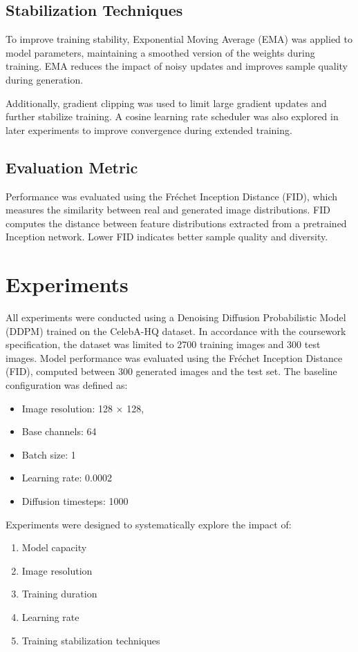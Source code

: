\documentclass[conference]{IEEEtran}
\begin{document}
\subsection{Stabilization Techniques}

To improve training stability, Exponential Moving Average (EMA) was applied to model parameters, maintaining a smoothed version of the weights during training. EMA reduces the impact of noisy updates and improves sample quality during generation.

Additionally, gradient clipping was used to limit large gradient updates and further stabilize training. A cosine learning rate scheduler was also explored in later experiments to improve convergence during extended training.

\subsection{Evaluation Metric}

Performance was evaluated using the Fréchet Inception Distance (FID), which measures the similarity between real and generated image distributions. FID computes the distance between feature distributions extracted from a pretrained Inception network. Lower FID indicates better sample quality and diversity.

\section{Experiments}
All experiments were conducted using a Denoising Diffusion Probabilistic Model (DDPM) trained on the CelebA-HQ dataset. In accordance with the coursework specification, the dataset was limited to 2700 training images and 300 test images. Model performance was evaluated using the Fréchet Inception Distance (FID), computed between 300 generated images and the test set.
The baseline configuration was defined as:
\begin{itemize}
  \item Image resolution: 128 × 128,
  \item Base channels: 64
  \item Batch size: 1
  \item Learning rate: 0.0002
  \item Diffusion timesteps: 1000
\end{itemize}

Experiments were designed to systematically explore the impact of:

\begin{enumerate}
  \item Model capacity
  \item Image resolution
  \item Training duration
  \item Learning rate
  \item Training stabilization techniques
\end{enumerate}
\end{document}
